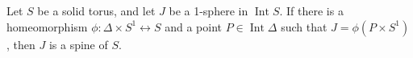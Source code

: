 Let $S$ be a solid torus, and let $J$ be a 1-sphere in $\operatorname{Int} S$. If there is a homeomorphism $\phi: \Delta \times S^1 \leftrightarrow S$ and a point $P \in \operatorname{Int} \Delta$ such that $J = \phi(P \times S^1)$, then $J$ is a spine of $S$.
